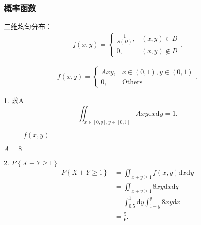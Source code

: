 \subsubsection*{概率函数}%
\label{subsub:概率函数}
\begin{notation}
    二维均匀分布：
    \begin{align*}
        f\left( x,y \right) =\begin{cases}
            {\frac{1}{S\left( D \right) }},&\left( x,y \right) \in D\\
            0 ,& \left( x,y \right) \not\in D
        \end{cases}
    .\end{align*}
\end{notation}
\begin{eg}
    \begin{align*}
        f\left( x,y \right) =\begin{cases}
            Axy,&x\in \left( 0,1 \right) ,y\in \left( 0,1 \right) \\
            0,&\text{Others}
        \end{cases}
    .\end{align*}

    1. 求A
    \[
        \iint_{x\in [0,y] ,y\in [0,1] } Axy \mathrm{d}x\mathrm{d}y=1
    .\] 
    \begin{figure}[htpb]
        \centering
        \caption{$f\left( x,y \right) $}%
        \label{f( x,y )}
    \end{figure}

    $A=8$

    2. $P\left\{ X+Y\ge 1 \right\} $ 
    \begin{align*}
        P\left\{ X+Y\ge 1 \right\} &=\iint_{x+y\ge 1} f\left( x,y \right)  \mathrm{d}x\mathrm{d}y \\
        &= \iint_{x+y\ge 1} 8xy \mathrm{d}x\mathrm{d}y \\
        &= \int_{0.5}^{1} \mathrm{d}y \int_{1-y}^{y} 8xy \mathrm{d}x \\
        &= \frac{5}{6}
    .\end{align*}


\end{eg}
